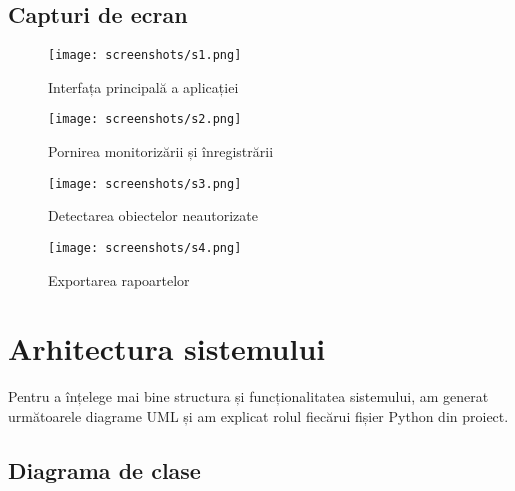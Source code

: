 \documentclass[12pt,a4paper]{article}
\begin{document}
\subsection{Capturi de ecran}

\begin{figure}[H]
    \centering
    \texttt{[image: screenshots/s1.png]}
    \caption{Interfața principală a aplicației}
\end{figure}

\begin{figure}[H]
    \centering
    \texttt{[image: screenshots/s2.png]}
    \caption{Pornirea monitorizării și înregistrării}
\end{figure}

\begin{figure}[H]
    \centering
    \texttt{[image: screenshots/s3.png]}
    \caption{Detectarea obiectelor neautorizate}
\end{figure}

\begin{figure}[H]
    \centering
    \texttt{[image: screenshots/s4.png]}
    \caption{Exportarea rapoartelor}
\end{figure}

\section{Arhitectura sistemului}

Pentru a înțelege mai bine structura și funcționalitatea sistemului, am generat următoarele diagrame UML și am explicat rolul fiecărui fișier Python din proiect.

\subsection{Diagrama de clase}
\end{document}
